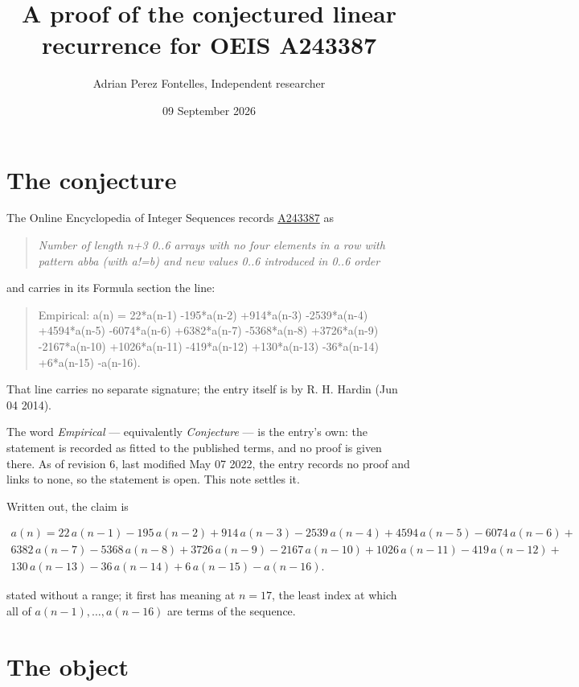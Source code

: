 \documentclass[11pt]{article}
\title{A proof of the conjectured linear recurrence for OEIS A243387}
\author{Adrian Perez Fontelles, Independent researcher}
\date{09 September 2026}
\theoremstyle{definition}
\begin{document}
\maketitle
\section{The conjecture}

The Online Encyclopedia of Integer Sequences records \href{https://oeis.org/A243387}{A243387} as

\begin{quote}\itshape Number of length n+3 0..6 arrays with no four elements in a row with pattern abba (with a!=b) and new values 0..6 introduced in 0..6 order\end{quote}

and carries in its Formula section the line:

\begin{quote}\ttfamily Empirical: a(n) = 22*a(n-1) -195*a(n-2) +914*a(n-3) -2539*a(n-4) +4594*a(n-5) -6074*a(n-6) +6382*a(n-7) -5368*a(n-8) +3726*a(n-9) -2167*a(n-10) +1026*a(n-11) -419*a(n-12) +130*a(n-13) -36*a(n-14) +6*a(n-15) -a(n-16).\end{quote}

That line carries no separate signature; the entry itself is by R. H. Hardin (Jun 04 2014).

The word {\itshape Empirical} --- equivalently {\itshape Conjecture} --- is the entry's own: the statement is recorded as fitted to the published terms, and no proof is given there. As of revision 6, last modified May 07 2022, the entry records no proof and links to none, so the statement is open. This note settles it.

Written out, the claim is

\begin{multline*} a(n) = 22\,a(n-1) - 195\,a(n-2) + 914\,a(n-3) - 2539\,a(n-4) + 4594\,a(n-5) - 6074\,a(n-6) + \\ 6382\,a(n-7) - 5368\,a(n-8) + 3726\,a(n-9) - 2167\,a(n-10) + 1026\,a(n-11) - 419\,a(n-12) + \\ 130\,a(n-13) - 36\,a(n-14) + 6\,a(n-15) - a(n-16). \end{multline*}

stated without a range; it first has meaning at $n = 17$, the least index at which all of $a(n-1),\dots,a(n-16)$ are terms of the sequence.

\section{The object}
\end{document}
